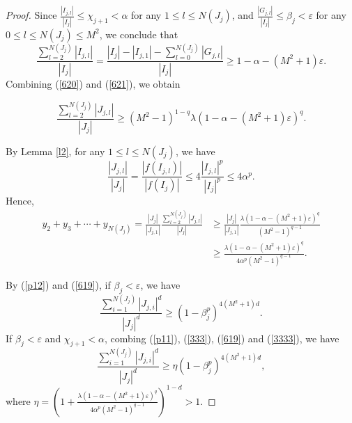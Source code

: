 \documentclass[reqno]{amsart}
\theoremstyle{plain}
\theoremstyle{definition}
\theoremstyle{remark}
\numberwithin{equation}{section} \DeclareMathOperator\intr{int}
\begin{document}
\begin{proof}
Since $\frac{\left | I_{j,l} \right | }{\left | I_j \right | }\le\chi_{j+1}<\alpha$ for any $1\le l \le N(J_j)$, and $\frac{\left | G_{j,l} \right | }{\left | I_j \right | }\le \beta_j<\varepsilon $ for any $0\le l \le N(J_j)\le M^2$, we conclude that
\begin{equation}\label{621}
\frac{\sum_{l=2}^{N(J_j)}\left | I_{j,l} \right | }{\left | I_j \right |}=\frac{\left | I_{j} \right |-\left | I_{j,1} \right |-\sum_{l=0}^{N(J_j)}\left | G_{j,l} \right |  }{\left | I_j \right |}\ge1-\alpha-(M^2+1)\varepsilon .
\end{equation}
Combining (\ref{620}) and (\ref{621}), we obtain

\begin{equation}\label{p13}
\frac{{\sum_{l=2}^{N(J_j)}\left | J_{j,l} \right | }}{\left | J_j \right |}\ge (M^2-1)^{1-q}\lambda(1-\alpha-(M^2+1)\varepsilon )^q.
\end{equation}

By Lemma \ref{l2}, for any $1\le l \le N(J_j)$, we have
\begin{equation*}
\frac{\left | J_{j,l} \right | }{\left | J_j \right |}=\frac{\left | f(I_{j,l}) \right | }{\left | f(I_j) \right |}\le4\frac{\left | I_{j,l} \right |^p }{\left | I_j \right |^p}\le 4\alpha^p.
\end{equation*}
Hence,
\begin{equation}\label{3333}
\begin{aligned}
y_2+y_3+\cdots+y_{N(J_j)}=\frac{\left | J_j \right |}{\left | J_{j,1} \right | }\frac{{\sum_{l=2}^{N(J_j)}\left | J_{j,l} \right | }}{\left | J_j \right |}&\ge \frac{\left | J_j \right |}{\left | J_{j,1} \right | }\frac{\lambda(1-\alpha-(M^2+1)\varepsilon )^q}{(M^2-1)^{q-1}}\\&\ge \frac{\lambda(1-\alpha-(M^2+1)\varepsilon )^q}{4\alpha^p(M^2-1)^{q-1}}.
\end{aligned}
\end{equation}

By (\ref{p12}) and (\ref{619}), if $\beta_j<\varepsilon$, we have
\begin{equation}\label{637}
\frac{\sum_{i=1}^{N(J_j)}\left | J_{j,i} \right |^d }{\left | J_j \right |^d }\ge (1-\beta^p_j)^{4(M^2+1)d}.
\end{equation}
If $\beta_j<\varepsilon$ and $\chi_{j+1}<\alpha$, combing (\ref{p11}),  (\ref{333}), (\ref{619}) and (\ref{3333}), we have
\begin{equation}\label{638}
\frac{\sum_{i=1}^{N(J_j)}\left | J_{j,i} \right |^d }{\left | J_j \right |^d }\ge \eta(1-\beta^p_j)^{4(M^2+1)d},
\end{equation}
where $\eta=(1+\frac{\lambda(1-\alpha-(M^2+1)\varepsilon )^q}{4\alpha^p(M^2-1)^{q-1}})^{1-d}>1.$


\end{proof}
\end{document}
